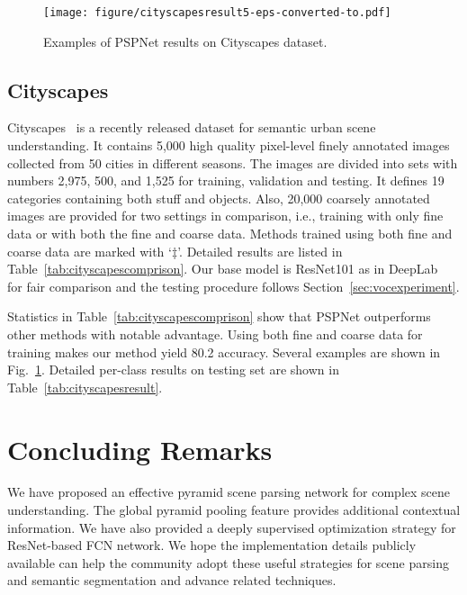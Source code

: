 \documentclass[10pt,twocolumn,letterpaper]{article}
\begin{document}
\begin{figure}
\begin{center}
\texttt{[image: figure/cityscapesresult5-eps-converted-to.pdf]}
\end{center}
   \caption{Examples of PSPNet results on Cityscapes dataset.}
\label{fig:cityscapesresult}
\end{figure}

\subsection{Cityscapes}
Cityscapes~\cite{cordts2016cityscapes} is a recently released dataset for semantic urban
scene understanding. It contains 5,000 high quality pixel-level finely annotated images
collected from 50 cities in different seasons. The images are divided into sets with
numbers 2,975, 500, and 1,525 for training, validation and testing. It defines 19
categories containing both stuff and objects. Also, 20,000 coarsely annotated images are
provided for two settings in comparison, i.e., training with only fine data or with both
the fine and coarse data. Methods trained using both fine and coarse data are marked with
`$\ddag$'. Detailed results are listed in Table~\ref{tab:cityscapescomprison}. Our base model is
ResNet101 as in DeepLab~\cite{chen2016deeplab} for fair comparison and the testing procedure
follows Section~\ref{sec:vocexperiment}.

Statistics in Table~\ref{tab:cityscapescomprison} show that PSPNet outperforms other
methods with notable advantage. Using both fine and coarse data for training makes our
method yield 80.2 accuracy. Several examples are shown in
Fig.~\ref{fig:cityscapesresult}. Detailed per-class results on testing set are shown in
Table~\ref{tab:cityscapesresult}.

\vspace{-0.05in}
\section{Concluding Remarks}
We have proposed an effective pyramid scene parsing network for complex scene
understanding. The global pyramid pooling feature provides additional contextual
information. We have also provided a deeply supervised optimization strategy for
ResNet-based FCN network.
We hope the implementation details publicly available can help
the community adopt these useful strategies for scene parsing and semantic segmentation
and advance related techniques.
\end{document}
